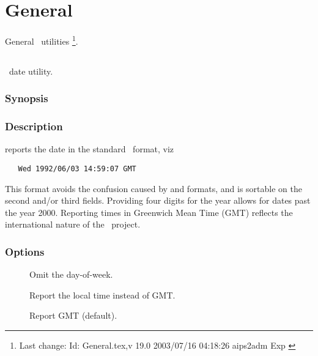 \chapter{General}
\label{General}

General \aipspp\ utilities \footnote{Last change:
$ $Id: General.tex,v 19.0 2003/07/16 04:18:26 aips2adm Exp $ $}.


\section{}
\label{adate}

\aipspp\ date utility.

\subsection*{Synopsis}

\begin{synopsis}
\end{synopsis}

\subsection*{Description}

 reports the date in the standard \aipspp\ format, viz

\begin{verbatim}
   Wed 1992/06/03 14:59:07 GMT
\end{verbatim}

\noindent
This format avoids the confusion caused by  and 
formats, and is sortable on the second and/or third fields.  Providing four
digits for the year allows for dates past the year 2000.  Reporting times in
Greenwich Mean Time (GMT) reflects the international nature of the \aipspp\ 
project.

\subsection*{Options}

\begin{description}
\item[]
   Omit the day-of-week.

\item[]
   Report the local time instead of GMT.

\item[]
   Report GMT (default).
\end{description}

